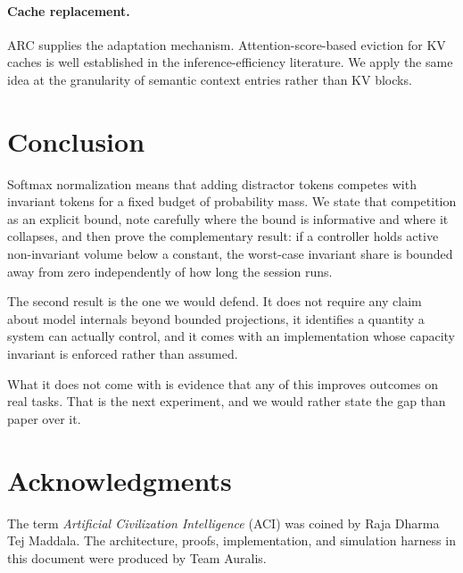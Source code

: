 ﻿\documentclass[11pt,a4paper]{article}
\theoremstyle{plain}
\theoremstyle{definition}
\theoremstyle{remark}
\begin{document}
\paragraph{Cache replacement.} ARC \cite{megiddo2003arc} supplies the adaptation
mechanism. Attention-score-based eviction for KV caches is well established in
the inference-efficiency literature. We apply the same idea at the granularity of
semantic context entries rather than KV blocks.

\section{Conclusion}
\label{sec:conclusion}

Softmax normalization means that adding distractor tokens competes with
invariant tokens for a fixed budget of probability mass. We state that
competition as an explicit bound, note carefully where the bound is informative
and where it collapses, and then prove the complementary result: if a controller
holds active non-invariant volume below a constant, the worst-case invariant
share is bounded away from zero independently of how long the session runs.

The second result is the one we would defend. It does not require any claim about
model internals beyond bounded projections, it identifies a quantity a system can
actually control, and it comes with an implementation whose capacity invariant is
enforced rather than assumed.

What it does not come with is evidence that any of this improves outcomes on real
tasks. That is the next experiment, and we would rather state the gap than paper
over it.

\section*{Acknowledgments}

The term \emph{Artificial Civilization Intelligence} (ACI) was coined by Raja
Dharma Tej Maddala. The architecture, proofs, implementation, and simulation
harness in this document were produced by Team Auralis.
\end{document}
